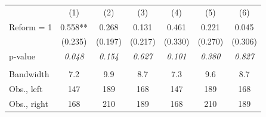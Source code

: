 \begin{tabular}{lcccccc}
 & (1) & (2) & (3) & (4) & (5) & (6) \\
Reform = 1 & 0.558** & 0.268 & 0.131 & 0.461 & 0.221 & 0.045 \\
 & (0.235) & (0.197) & (0.217) & (0.330) & (0.270) & (0.306) \\
p-value & \textit{0.048} & \textit{0.154} & \textit{0.627} & \textit{0.101} & \textit{0.380} & \textit{0.827} \\
 & & & & & & \\
Bandwidth & 7.2 & 9.9 & 8.7 & 7.3 & 9.6 & 8.7 \\
Obs., left & 147 & 189 & 168 & 147 & 189 & 168 \\
Obs., right & 168 & 210 & 189 & 168 & 210 & 189 \\
\end{tabular}
